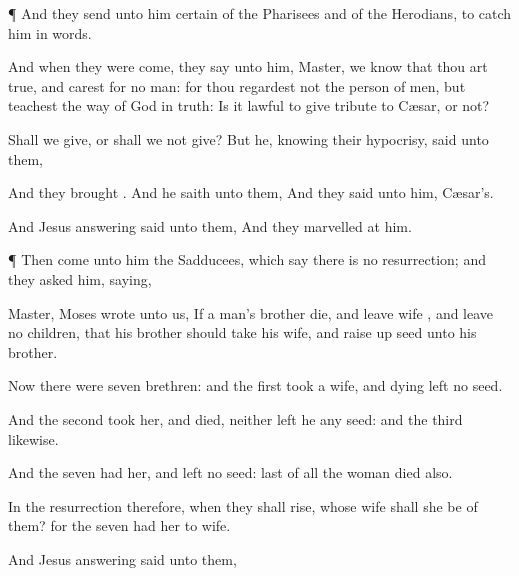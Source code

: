 {\par }{\PP {}¶
And they
send
unto
him
certain of the
Pharisees
and of the
Herodians,
to
catch
him
in
{}
words.

And
when they were
come, they
say unto
him,
Master, we
know
that thou
art
true,
and
carest
for no
man:
for thou
regardest
not the
person of
men,
but
teachest the
way of
God
in
truth: Is it
lawful to
give
tribute to
Cæsar,
or
not?

Shall we
give,
or shall
we
not
give?
But
he,
knowing
their
hypocrisy,
said unto
them,
{}

And they
brought
{}.
And he
saith unto
them,
{}
And they
said unto
him,
Cæsar’s.

And
Jesus
answering
said unto
them,
{}
And they
marvelled
at
him.


\par }{\PP {}¶
Then
come
unto
him the
Sadducees,
which
say there
is
no
resurrection;
and they
asked
him,
saying,

Master,
Moses
wrote unto
us,
If a
man’s
brother
die,
and
leave
{}
wife
{},
and
leave
no
children,
that
his
brother should
take
his
wife,
and raise
up
seed unto
his
brother.

Now there
were
seven
brethren:
and the
first
took a
wife,
and
dying
left
no
seed.

And the
second
took
her,
and
died,
neither
left
he any
seed:
and the
third
likewise.

And the
seven
had
her,
and
left
no
seed:
last of
all the
woman
died
also.

In the
resurrection
therefore,
when they shall
rise,
whose
wife shall she
be of
them?
for the
seven
had
her to
wife.

And
Jesus
answering
said unto
them,
{}



}
